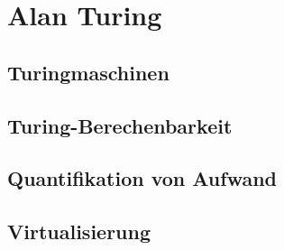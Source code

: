 \chapter{Alan Turing}
\section{Turingmaschinen}
\section{Turing-Berechenbarkeit}
\section{Quantifikation von Aufwand}
\section{Virtualisierung}
